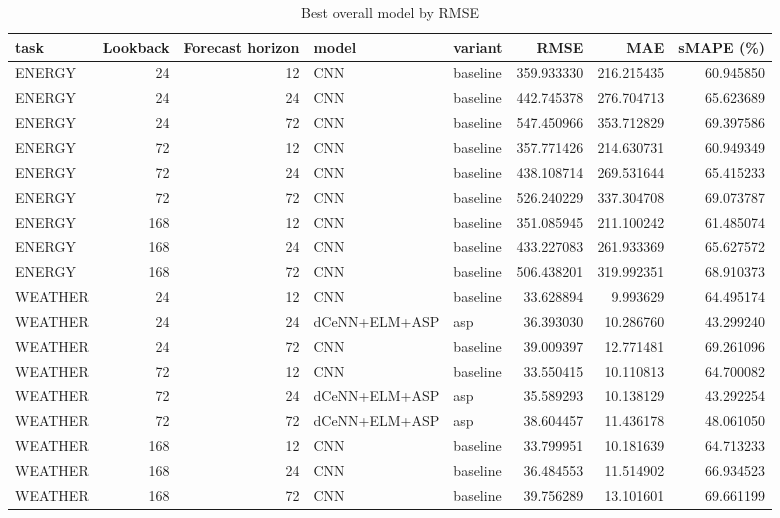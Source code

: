 \begin{table}
\caption{Best overall model by RMSE}
\begin{tabular}{lrrllrrr}
\toprule
task & Lookback & Forecast horizon & model & variant & RMSE & MAE & sMAPE (\%) \\
\midrule
ENERGY & 24 & 12 & CNN & baseline & 359.933330 & 216.215435 & 60.945850 \\
ENERGY & 24 & 24 & CNN & baseline & 442.745378 & 276.704713 & 65.623689 \\
ENERGY & 24 & 72 & CNN & baseline & 547.450966 & 353.712829 & 69.397586 \\
ENERGY & 72 & 12 & CNN & baseline & 357.771426 & 214.630731 & 60.949349 \\
ENERGY & 72 & 24 & CNN & baseline & 438.108714 & 269.531644 & 65.415233 \\
ENERGY & 72 & 72 & CNN & baseline & 526.240229 & 337.304708 & 69.073787 \\
ENERGY & 168 & 12 & CNN & baseline & 351.085945 & 211.100242 & 61.485074 \\
ENERGY & 168 & 24 & CNN & baseline & 433.227083 & 261.933369 & 65.627572 \\
ENERGY & 168 & 72 & CNN & baseline & 506.438201 & 319.992351 & 68.910373 \\
WEATHER & 24 & 12 & CNN & baseline & 33.628894 & 9.993629 & 64.495174 \\
WEATHER & 24 & 24 & dCeNN+ELM+ASP & asp & 36.393030 & 10.286760 & 43.299240 \\
WEATHER & 24 & 72 & CNN & baseline & 39.009397 & 12.771481 & 69.261096 \\
WEATHER & 72 & 12 & CNN & baseline & 33.550415 & 10.110813 & 64.700082 \\
WEATHER & 72 & 24 & dCeNN+ELM+ASP & asp & 35.589293 & 10.138129 & 43.292254 \\
WEATHER & 72 & 72 & dCeNN+ELM+ASP & asp & 38.604457 & 11.436178 & 48.061050 \\
WEATHER & 168 & 12 & CNN & baseline & 33.799951 & 10.181639 & 64.713233 \\
WEATHER & 168 & 24 & CNN & baseline & 36.484553 & 11.514902 & 66.934523 \\
WEATHER & 168 & 72 & CNN & baseline & 39.756289 & 13.101601 & 69.661199 \\
\bottomrule
\end{tabular}
\end{table}

